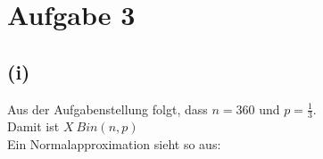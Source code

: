 \documentclass[a4paper,10pt]{article}
\title{}
\author{}
\begin{document}
\maketitle



\section*{Aufgabe 3}
\subsection*{(i)}
Aus der Aufgabenstellung folgt, dass $n = 360$ und $p = \frac{1}{3}$.\\
Damit ist $X ~ Bin(n,p)$ \\
Ein Normalapproximation sieht so aus:\\
\
\end{document}
